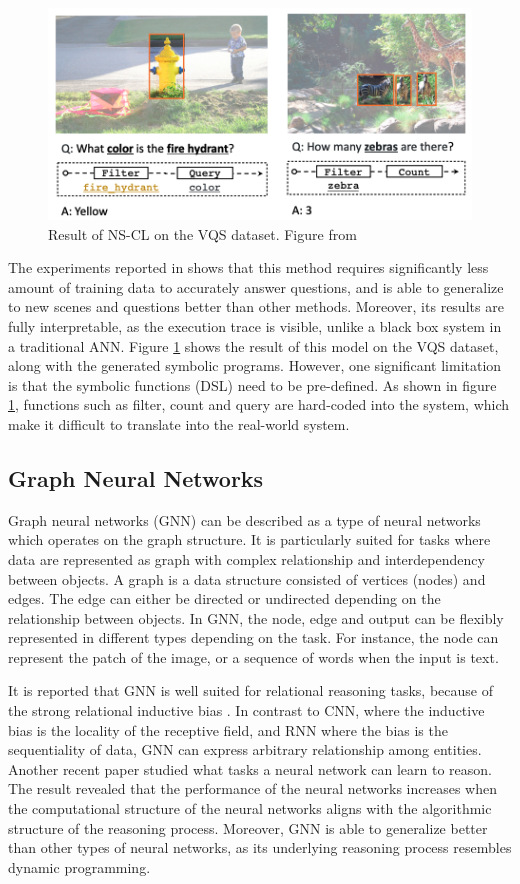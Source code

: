 \documentclass[journal]{IEEEtran}
\begin{document}
\begin{figure}[htb]
  \centering
  \includegraphics[width=0.8\columnwidth]{nscl.png}
  \caption{Result of NS-CL on the VQS dataset. Figure from \cite{Mao2019NeuroSymbolic}}
  \label{nscl}
\end{figure}

The experiments reported in \cite{Mao2019NeuroSymbolic} shows that this method requires significantly less amount of training data to accurately answer questions, 
and is able to generalize to new scenes and questions better than other methods. 
Moreover, its results are fully interpretable, as the execution trace is visible, 
unlike a black box system in a traditional ANN.
Figure \ref{nscl} shows the result of this model on the VQS dataset, along with the generated symbolic programs. 
However, one significant limitation is that the symbolic functions (DSL) need to be pre-defined. 
As shown in figure \ref{nscl}, functions such as filter, count and query are hard-coded into the system, 
which make it difficult to translate into the real-world system.

\subsection{Graph Neural Networks}

Graph neural networks (GNN) can be described as a type of neural networks which operates on the graph structure.
It is particularly suited for tasks where data are represented as graph with complex relationship and interdependency between objects.
A graph is a data structure consisted of vertices (nodes) and edges.
The edge can either be directed or undirected depending on the relationship between objects.
In GNN, the node, edge and output can be flexibly represented in different types depending on the task. 
For instance, the node can represent the patch of the image, or a sequence of words when the input is text.

It is reported that GNN is well suited for relational reasoning tasks, because of the strong relational inductive bias \cite{graphnetworks}.
In contrast to CNN, where the inductive bias is the locality of the receptive field, 
and RNN where the bias is the sequentiality of data, GNN can express arbitrary relationship among entities. 
Another recent paper \cite{xu2019can} studied what tasks a neural network can learn to reason. 
The result revealed that the performance of the neural networks increases
when the computational structure of the neural networks aligns with the algorithmic structure of the reasoning process. 
Moreover, GNN is able to generalize better than other types of neural networks, 
as its underlying reasoning process resembles dynamic programming.
\end{document}
